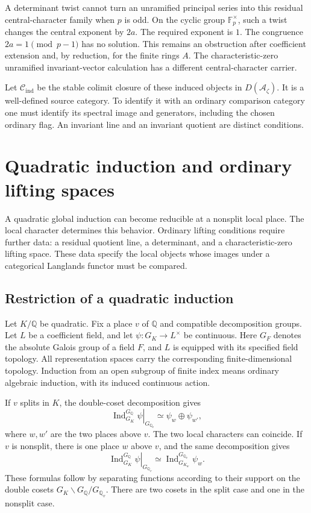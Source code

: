 A determinant twist cannot turn an unramified principal series into
this residual central-character family when $p$ is odd. On the cyclic
group $\mathbb F_p^\times$, such a twist changes the central exponent
by $2a$. The required exponent is $1$. The congruence
$2a=1\pmod{p-1}$ has no solution. This remains an obstruction after
coefficient extension and, by reduction, for the finite rings $A$.
The characteristic-zero unramified invariant-vector calculation has
a different central-character carrier.


Let \(\mathcal C_{\mathrm{ind}}\) be the stable colimit closure
of these induced objects in \(D(\mathcal A_\zeta)\).
It is a well-defined source category. To identify it with an
ordinary comparison category one must identify its spectral image
and generators, including the chosen ordinary flag.
An invariant line and an invariant quotient are distinct conditions.

\section{Quadratic induction and ordinary lifting spaces}

A quadratic global induction can become reducible at a nonsplit local
place. The local character determines this behavior. Ordinary lifting
conditions require further data: a residual quotient line, a determinant,
and a characteristic-zero lifting space. These data specify the local
objects whose images under a categorical Langlands functor must be
compared.

\subsection{Restriction of a quadratic induction}

Let $K/\mathbb Q$ be quadratic. Fix a place $v$ of $\mathbb Q$ and
compatible decomposition groups. Let $L$ be a coefficient field, and
let $\psi:G_K\to L^\times$ be continuous. Here $G_F$ denotes the absolute Galois group of a field $F$,
and $L$ is equipped with its specified field topology. All representation
spaces carry the corresponding finite-dimensional topology. Induction from an open subgroup
of finite index means ordinary algebraic induction, with its induced
continuous action.

If $v$ splits in $K$, the double-coset decomposition gives
\[
 \left.\operatorname{Ind}_{G_K}^{G_{\mathbb Q}}\psi\right|_{G_{\mathbb Q_v}}
 \simeq \psi_w\oplus\psi_{w'},
\]
where $w,w'$ are the two places above $v$. The two local characters
can coincide. If $v$ is nonsplit, there is one place $w$ above $v$,
and the same decomposition gives
\[
 \left.\operatorname{Ind}_{G_K}^{G_{\mathbb Q}}\psi\right|_{G_{\mathbb Q_v}}
 \simeq\operatorname{Ind}_{G_{K_w}}^{G_{\mathbb Q_v}}\psi_w.
\]
These formulas follow by separating functions according to their support
on the double cosets $G_K\backslash G_{\mathbb Q}/G_{\mathbb Q_v}$.
There are two cosets in the split case and one in the nonsplit case.

